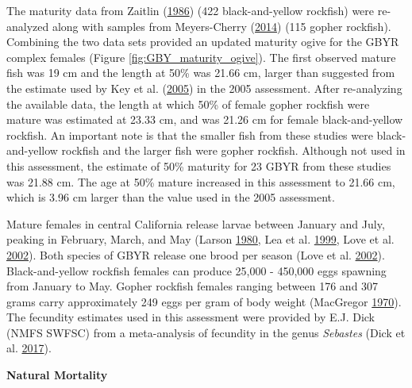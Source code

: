\documentclass[12pt,]{article}
\begin{document}
The maturity data from Zaitlin
(\protect\hyperlink{ref-Zaitlin1986}{1986}) (422 black-and-yellow
rockfish) were re-analyzed along with samples from Meyers-Cherry
(\protect\hyperlink{ref-MeyersCherry2014}{2014}) (115 gopher rockfish).
Combining the two data sets provided an updated maturity ogive for the
GBYR complex females (Figure \ref{fig:GBY_maturity_ogive}). The first
observed mature fish was 19 cm and the length at 50\% was 21.66 cm,
larger than suggested from the estimate used by Key et al.
(\protect\hyperlink{ref-Key2005}{2005}) in the 2005 assessment. After
re-analyzing the available data, the length at which 50\% of female
gopher rockfish were mature was estimated at 23.33 cm, and was 21.26 cm
for female black-and-yellow rockfish. An important note is that the
smaller fish from these studies were black-and-yellow rockfish and the
larger fish were gopher rockfish. Although not used in this assessment,
the estimate of 50\% maturity for 23 GBYR from these studies was 21.88
cm. The age at 50\% mature increased in this assessment to 21.66 cm,
which is 3.96 cm larger than the value used in the 2005 assessment.

Mature females in central California release larvae between January and
July, peaking in February, March, and May (Larson
\protect\hyperlink{ref-Larson1980}{1980}, Lea et al.
\protect\hyperlink{ref-Lea1999}{1999}, Love et al.
\protect\hyperlink{ref-Love2002}{2002}). Both species of GBYR release
one brood per season (Love et al.
\protect\hyperlink{ref-Love2002}{2002}). Black-and-yellow rockfish
females can produce 25,000 - 450,000 eggs spawning from January to May.
Gopher rockfish females ranging between 176 and 307 grams carry
approximately 249 eggs per gram of body weight (MacGregor
\protect\hyperlink{ref-MacGregor1970}{1970}). The fecundity estimates
used in this assessment were provided by E.J. Dick (NMFS SWFSC) from a
meta-analysis of fecundity in the genus \emph{Sebastes} (Dick et al.
\protect\hyperlink{ref-Dick2017}{2017}).

\vspace{.5cm} \textbf{Natural Mortality}
\end{document}
